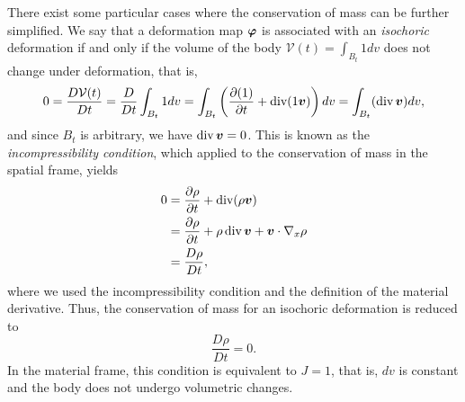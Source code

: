 \documentclass{article}
\renewcommand{\vec}{\vectorsym}
\DeclareMathOperator{\dive}{\text{div}}
\newcommand{\vx}{\nabla_x}
\newcommand{\vvarphi}{\vec{\varphi}}
\begin{document}
There exist some particular cases where the conservation of mass can be further simplified. We say that a deformation map $\vvarphi$ is associated with an \textit{isochoric} deformation if and only if the volume of the body $\mathcal{V}(t) = \int_{B_t}1dv$ does not change under deformation, that is, 
\begin{equation*}
    0 = \frac{D\mathcal{V}(t)}{Dt} = \frac{D}{Dt} \int_{B_t} 1dv = \int_{B_t} \left(\frac{\partial (1)}{\partial t} + \dive(1\vec v)\right)dv = \int_{B_t} (\dive\vec v)dv,
\end{equation*}
and since $B_t$ is arbitrary, we have $\dive \vec v = 0$. This is known as the \textit{incompressibility condition}, which applied to the conservation of mass in the spatial frame, yields
\begin{align*}
    0 &= \frac{\partial\rho}{\partial t} + \dive(\rho\vec v) \\
    &= \frac{\partial\rho}{\partial t} + \rho\dive\vec v + \vec v \cdot\vx \rho\\
    &= \frac{D\rho}{Dt},
\end{align*}
where we used the incompressibility condition and the definition of the material derivative. Thus, the conservation of mass for an isochoric deformation is reduced to 
\begin{equation*}
    \frac{D\rho}{Dt} = 0.
\end{equation*}
In the material frame, this condition is equivalent to $J=1$, that is, $dv$ is constant and the body does not undergo volumetric changes. 
\end{document}
